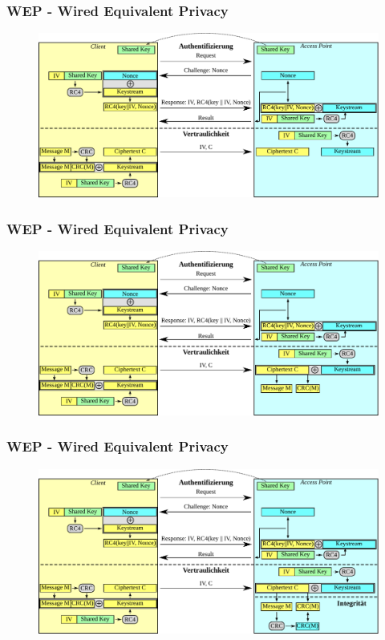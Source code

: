\documentclass{beamer}
\begin{document}
\begin{frame}
\frametitle{WEP - Wired Equivalent Privacy}
\begin{figure}
	\includegraphics[width=1.0\linewidth]{figures/WEP_privacy_6.pdf}
\end{figure}
\end{frame}

\begin{frame}
\frametitle{WEP - Wired Equivalent Privacy}
\begin{figure}
	\includegraphics[width=1.0\linewidth]{figures/WEP_integrity.pdf}
\end{figure}
\end{frame}

\begin{frame}
\frametitle{WEP - Wired Equivalent Privacy}
\begin{figure}
	\includegraphics[width=1.0\linewidth]{figures/WEP_complete.pdf}
\end{figure}
\end{frame}
\end{document}
